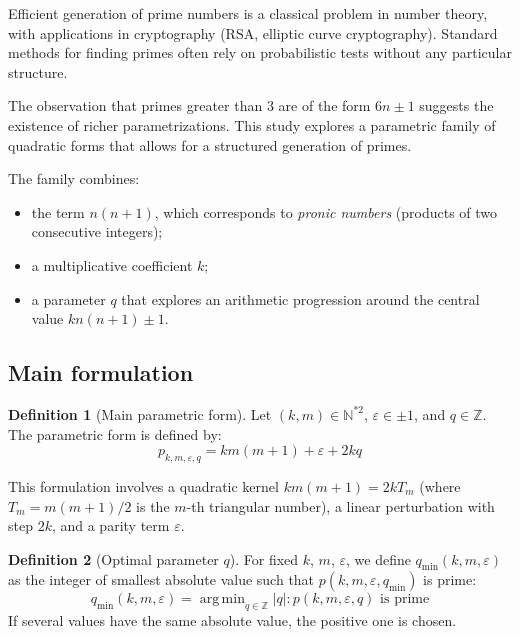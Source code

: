 \documentclass[11pt,a4paper]{article}
\theoremstyle{definition}
\newtheorem{definition}{Definition}[section]
\theoremstyle{plain}
\newcommand{\N}{\mathbb{N}}
\newcommand{\Z}{\mathbb{Z}}
\DeclareMathOperator*{\argmin}{arg\,min}
\def\{{}%
\def\}{}%
\def\boxed#1{#1}%
\begin{document}
Efficient generation of prime numbers is a classical problem in number theory, with applications in cryptography (RSA, elliptic curve cryptography). Standard methods for finding primes often rely on probabilistic tests without any particular structure.

The observation that primes greater than $3$ are of the form $6n\pm1$ suggests the existence of richer parametrizations. This study explores a parametric family of quadratic forms that allows for a structured generation of primes.

The family combines:
\begin{itemize}[leftmargin=*]
    \item the term $n(n+1)$, which corresponds to \textit{pronic numbers} (products of two consecutive integers);
    \item a multiplicative coefficient $k$;
    \item a parameter $q$ that explores an arithmetic progression around the central value $k n(n+1) \pm 1$.
\end{itemize}

\subsection{Main formulation}

\begin{definition}[Main parametric form]\label{def:main}
Let $(k,m) \in \N^{*2}$, $\varepsilon \in \{\pm 1\}$, and $q \in \Z$. The parametric form is defined by:
\begin{equation}\label{eq:main}
\boxed{p_{k,m,\varepsilon,q} = km(m+1) + \varepsilon + 2kq}
\end{equation}
\end{definition}

This formulation involves a quadratic kernel $km(m+1) = 2kT_m$ (where $T_m = m(m+1)/2$ is the $m$-th triangular number), a linear perturbation with step $2k$, and a parity term $\varepsilon$.

\begin{definition}[Optimal parameter $q$]\label{def:qmin}
For fixed $k$, $m$, $\varepsilon$, we define $q_{\min}(k,m,\varepsilon)$ as the integer of smallest absolute value such that $p(k,m,\varepsilon,q_{\min})$ is prime:
\begin{equation}
q_{\min}(k,m,\varepsilon) = \argmin_{q \in \Z} \{|q| : p(k,m,\varepsilon,q) \text{ is prime}\}
\end{equation}
If several values have the same absolute value, the positive one is chosen.
\end{definition}
\end{document}
